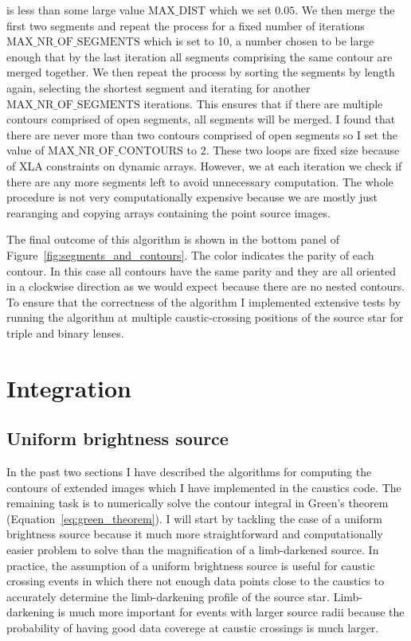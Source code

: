 \documentclass[12pt,dvipsnames]{report}
\newcommand{\ssf}[1]{\textsf{#1}}
\begin{document}
is less than some large value $\text{MAX\_DIST}$ which we set $0.05$. 
We then merge the first two segments and repeat the process for a fixed number of iterations 
$\text{MAX\_NR\_OF\_SEGMENTS}$ which is set to 10, a number chosen to be large enough that 
by the last iteration all segments comprising the same contour are merged together. 
We then repeat the process by sorting the segments by length again, selecting the shortest 
segment and iterating for another $\text{MAX\_NR\_OF\_SEGMENTS}$ iterations. This ensures that
if there are multiple contours comprised of open segments, all segments will be merged. 
I found that there are never more than two contours comprised of open segments so I set 
the value of $\text{MAX\_NR\_OF\_CONTOURS}$ to 2. These two loops are fixed size because of 
\ssf{XLA} constraints on dynamic arrays. However, we at each iteration we check if there are 
any more segments left to avoid unnecessary computation. The whole procedure is not very 
computationally expensive because we are mostly just rearanging and copying arrays containing
the point source images.

The final outcome of this algorithm is shown in the bottom panel of 
Figure~\ref{fig:segments_and_contours}. The color indicates the parity of each contour. In this 
case all contours have the same parity and they are all oriented in a clockwise direction
as we would expect because there are no nested contours. To ensure that the correctness of 
the algorithm I implemented extensive tests by running the algorithm at multiple caustic-crossing 
positions of the source star for triple and binary lenses. 

\section{Integration}
\label{sec:integration}
\subsection{Uniform brightness source}
In the past two sections I have described the algorithms for computing the contours of extended
images which I have implemented in the \ssf{caustics} code. The remaining task is to numerically 
solve the contour integral in Green's theorem (Equation~\ref{eq:green_theorem}). I will start by 
tackling the case of a uniform brightness source because it much more straightforward and 
computationally easier problem to solve than the magnification of a limb-darkened source. In
practice, the assumption of a uniform brightness source is useful for caustic crossing 
events in which there not enough data points close to the caustics to accurately determine 
the limb-darkening profile of the source star. Limb-darkening is much more important for 
events with larger source radii because the probability of having good data coverege at caustic
crossings is much larger. 
\end{document}
